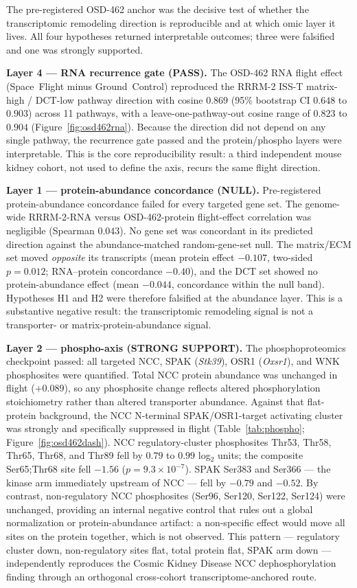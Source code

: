 \documentclass[11pt]{article}
\newcommand{\gene}[1]{\textit{#1}}
\begin{document}
The pre-registered OSD-462 anchor was the decisive test of whether the transcriptomic remodeling direction is reproducible and at which omic layer it lives. All four hypotheses returned interpretable outcomes; three were falsified and one was strongly supported.

\textbf{Layer 4 --- RNA recurrence gate (PASS).} The OSD-462 RNA flight effect (Space~Flight minus Ground~Control) reproduced the RRRM-2 ISS-T matrix-high / DCT-low pathway direction with cosine $0.869$ (95\% bootstrap CI $0.648$ to $0.903$) across 11 pathways, with a leave-one-pathway-out cosine range of $0.823$ to $0.904$ (Figure~\ref{fig:osd462rna}). Because the direction did not depend on any single pathway, the recurrence gate passed and the protein/phospho layers were interpretable. This is the core reproducibility result: a third independent mouse kidney cohort, not used to define the axis, recurs the same flight direction.

\textbf{Layer 1 --- protein-abundance concordance (NULL).} Pre-registered protein-abundance concordance failed for every targeted gene set. The genome-wide RRRM-2-RNA versus OSD-462-protein flight-effect correlation was negligible (Spearman $0.043$). No gene set was concordant in its predicted direction against the abundance-matched random-gene-set null. The matrix/ECM set moved \emph{opposite} its transcripts (mean protein effect $-0.107$, two-sided $p=0.012$; RNA--protein concordance $-0.40$), and the DCT set showed no protein-abundance effect (mean $-0.044$, concordance within the null band). Hypotheses H1 and H2 were therefore falsified at the abundance layer. This is a substantive negative result: the transcriptomic remodeling signal is not a transporter- or matrix-protein-abundance signal.

\textbf{Layer 2 --- phospho-axis (STRONG SUPPORT).} The phosphoproteomics checkpoint passed: all targeted NCC, SPAK (\gene{Stk39}), OSR1 (\gene{Oxsr1}), and WNK phosphosites were quantified. Total NCC protein abundance was unchanged in flight ($+0.089$), so any phosphosite change reflects altered phosphorylation stoichiometry rather than altered transporter abundance. Against that flat-protein background, the NCC N-terminal SPAK/OSR1-target activating cluster was strongly and specifically suppressed in flight (Table~\ref{tab:phospho}; Figure~\ref{fig:osd462dash}). NCC regulatory-cluster phosphosites Thr53, Thr58, Thr65, Thr68, and Thr89 fell by $0.79$ to $0.99$ log$_2$ units; the composite Ser65;Thr68 site fell $-1.56$ ($p=9.3\times10^{-7}$). SPAK Ser383 and Ser366 --- the kinase arm immediately upstream of NCC --- fell by $-0.79$ and $-0.52$. By contrast, non-regulatory NCC phosphosites (Ser96, Ser120, Ser122, Ser124) were unchanged, providing an internal negative control that rules out a global normalization or protein-abundance artifact: a non-specific effect would move all sites on the protein together, which is not observed. This pattern --- regulatory cluster down, non-regulatory sites flat, total protein flat, SPAK arm down --- independently reproduces the Cosmic Kidney Disease NCC dephosphorylation finding \citep{siew2024cosmic} through an orthogonal cross-cohort transcriptome-anchored route.
\end{document}
